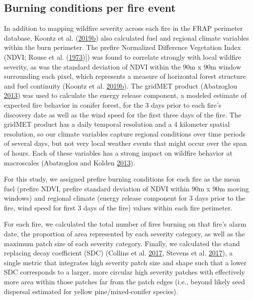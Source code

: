 \documentclass[twoside,12pt,final]{ucthesis-CA2012}
\begin{document}
\begin{ucmainmatter}
\subsection{Burning conditions per fire
event}\label{burning-conditions-per-fire-event}

In addition to mapping wildfire severity across each fire in the FRAP
perimeter database, Koontz et al.
(\protect\hyperlink{ref-koontz2019a}{2019}\protect\hyperlink{ref-koontz2019a}{b})
also calculated fuel and regional climate variables within the burn
perimeter. The prefire Normalized Difference Vegetation Index (NDVI;
Rouse et al. (\protect\hyperlink{ref-rouse1973}{1973}){]}) was found to
correlate strongly with local wildfire severity, as was the standard
deviation of NDVI within the 90m x 90m window surrounding each pixel,
which represents a measure of horizontal forest structure and fuel
continuity (Koontz et al.
\protect\hyperlink{ref-koontz2019a}{2019}\protect\hyperlink{ref-koontz2019a}{b}).
The gridMET product (Abatzoglou
\protect\hyperlink{ref-abatzoglou2013}{2013}) was used to calculate the
energy release component, a modeled estimate of expected fire behavior
in conifer forest, for the 3 days prior to each fire's discovery date as
well as the wind speed for the first three days of the fire. The gridMET
product has a daily temporal resolution and a 4 kilometer spatial
resolution, so our climate variables capture regional conditions over
time periods of several days, but not very local weather events that
might occur over the span of hours. Each of these variables has a strong
impact on wildfire behavior at macroscales (Abatzoglou and Kolden
\protect\hyperlink{ref-abatzoglou2013a}{2013}).

For this study, we assigned prefire burning conditions for each fire as
the mean fuel (prefire NDVI, prefire standard deviation of NDVI within
90m x 90m moving windows) and regional climate (energy release component
for 3 days prior to the fire, wind speed for first 3 days of the fire)
values within each fire perimeter.

For each fire, we calculated the total number of fires burning on that
fire's alarm date, the proportion of area represented by each severity
category, as well as the maximum patch size of each severity category.
Finally, we calculated the stand replacing decay coefficient (SDC)
(Collins et al. \protect\hyperlink{ref-collins2017}{2017}, Stevens et
al. \protect\hyperlink{ref-stevens2017}{2017}), a single metric that
integrates high severity patch size and shape such that a lower SDC
corresponds to a larger, more circular high severity patches with
effectively more area within those patches far from the patch edges
(i.e., beyond likely seed dispersal estimated for yellow
pine/mixed-conifer species).


\end{ucmainmatter}
\end{document}
